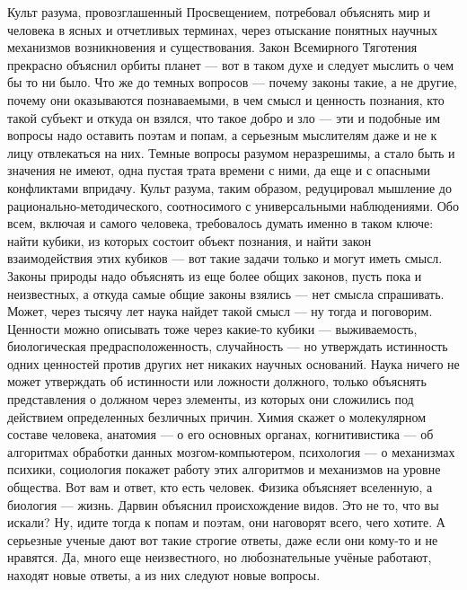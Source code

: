 \begin{multicols}{3}
Культ разума, провозглашенный Просвещением, потребовал объяснять мир и человека
в ясных и отчетливых терминах, через отыскание понятных научных механизмов
возникновения и существования. Закон Всемирного Тяготения прекрасно объяснил
орбиты планет — вот в таком духе и следует мыслить о чем бы то ни было. Что же
до темных вопросов — почему законы такие, а не другие, почему они оказываются
познаваемыми, в чем смысл и ценность познания,  кто такой субъект и откуда он
взялся, что такое добро и зло — эти и подобные им вопросы надо оставить поэтам
и попам, а серьезным мыслителям даже и не к лицу отвлекаться на них. Темные
вопросы разумом неразрешимы, а стало быть и значения не имеют, одна пустая
трата времени с ними, да еще и с опасными конфликтами впридачу. Культ разума,
таким образом, редуцировал мышление до рационально-методического, соотносимого
с универсальными наблюдениями. Обо всем, включая и самого человека, требовалось
думать именно в таком ключе: найти кубики, из которых состоит объект познания,
и найти закон взаимодействия этих кубиков — вот такие задачи только и могут
иметь смысл. Законы природы надо объяснять из еще более общих законов, пусть
пока и неизвестных, а откуда самые общие законы взялись — нет смысла
спрашивать. Может, через тысячу лет наука найдет такой смысл — ну тогда и
поговорим. Ценности можно описывать тоже через какие-то кубики — выживаемость,
биологическая предрасположенность, случайность — но утверждать истинность одних
ценностей против других нет никаких научных оснований. Наука ничего не может
утверждать об истинности или ложности должного, только объяснять представления
о должном через элементы, из которых они сложились под действием определенных
безличных причин. Химия скажет о молекулярном составе человека, анатомия — о
его основных органах, когнитивистика — об алгоритмах обработки данных
мозгом-компьютером, психология — о механизмах психики, социология покажет
работу этих алгоритмов и механизмов на уровне общества. Вот вам и ответ, кто
есть человек. Физика объясняет вселенную, а биология — жизнь. Дарвин объяснил
происхождение видов. Это не то, что вы искали? Ну, идите тогда к попам и
поэтам, они наговорят всего, чего хотите. А серьезные ученые дают вот такие
строгие ответы, даже если они кому-то и не нравятся. Да, много еще
неизвестного, но любознательные учёные работают, находят новые ответы, а из них
следуют новые вопросы.  


\end{multicols}
